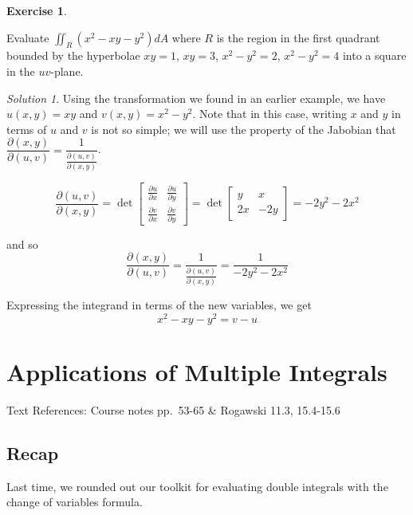 \documentclass[
]{book}
\theoremstyle{definition}
\theoremstyle{definition}
\theoremstyle{definition}
\newtheorem{exercise}{Exercise}[chapter]
\theoremstyle{definition}
\theoremstyle{remark}
\newtheorem*{solution}{Solution}
\begin{document}
\begin{exercise}
\protect\hypertarget{exr:unlabeled-div-102}{}\label{exr:unlabeled-div-102}

Evaluate \(\displaystyle \iint_R (x^2-xy -y^2) dA\) where \(R\) is the region in the first quadrant bounded by the hyperbolae \(xy=1\), \(xy=3\), \(x^2-y^2=2\), \(x^2-y^2=4\) into a square in the \(uv\)-plane.

\end{exercise}

\begin{solution}

Using the transformation we found in an earlier example, we have \(u(x,y)=xy\) and \(v(x,y)=x^2-y^2\). Note that in this case, writing \(x\) and \(y\) in terms of \(u\) and \(v\) is not so simple; we will use the property of the Jabobian that \(\dfrac{\partial(x,y)}{\partial(u,v)}=\dfrac{1}{\frac{\partial(u,v)}{\partial(x,y)}}\).

\[\frac{\partial(u,v)}{\partial(x,y)} = \det \begin{bmatrix}\frac{\partial u}{\partial x}&\frac{\partial u}{\partial y}\\ \frac{\partial v}{\partial x}& \frac{\partial v}{\partial y}\end{bmatrix}=\det\begin{bmatrix}y & x\\2x& -2y\end{bmatrix}=-2y^2-2x^2\]

and so \[\dfrac{\partial(x,y)}{\partial(u,v)}=\dfrac{1}{\frac{\partial(u,v)}{\partial(x,y)}} = \frac{1}{-2y^2-2x^2}\]

Expressing the integrand in terms of the new variables, we get \[x^2-xy -y^2 = v-u\]

\end{solution}

\hypertarget{lec-14}{%
\chapter{Applications of Multiple Integrals}\label{lec-14}}

Text References: Course notes pp.~53-65 \& Rogawski 11.3, 15.4-15.6

\hypertarget{recap-12}{%
\section{Recap}\label{recap-12}}

Last time, we rounded out our toolkit for evaluating double integrals with the change of variables formula.
\end{document}
